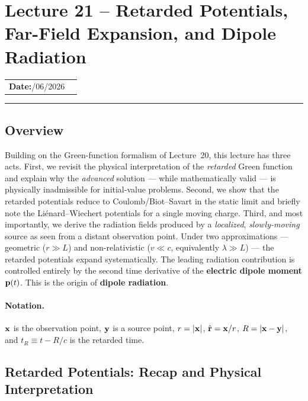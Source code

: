 \section{Lecture 21 -- Retarded Potentials, Far-Field Expansion, and Dipole Radiation}\label{sec:lec21}

\begin{center}
\begin{tabular}{ll}
  \textbf{Date:}\quad 16/06/2026 & \\
\end{tabular}
\end{center}
\hrule\vspace{1.5em}

\subsection*{Overview}

Building on the Green-function formalism of Lecture~20, this lecture has three acts.
First, we revisit the physical interpretation of the \emph{retarded} Green function and
explain why the \emph{advanced} solution --- while mathematically valid --- is physically
inadmissible for initial-value problems.
Second, we show that the retarded potentials reduce to Coulomb/Biot--Savart in the static
limit and briefly note the Liénard--Wiechert potentials for a single moving charge.
Third, and most importantly, we derive the radiation fields produced by a \emph{localized},
\emph{slowly-moving} source as seen from a distant observation point. Under two
approximations --- geometric ($r \gg L$) and non-relativistic ($v \ll c$, equivalently
$\lambda \gg L$) --- the retarded potentials expand systematically. The leading
radiation contribution is controlled entirely by the second time derivative of the
\textbf{electric dipole moment} $\mathbf{p}(t)$. This is the origin of \textbf{dipole
radiation}.

\paragraph{Notation.}
$\mathbf{x}$ is the observation point, $\mathbf{y}$ is a source point, $r=|\mathbf{x}|$,
$\hat{\mathbf{r}}=\mathbf{x}/r$, $R=|\mathbf{x}-\mathbf{y}|$, and $t_R \equiv t - R/c$ is the
retarded time.

\subsection{Retarded Potentials: Recap and Physical Interpretation}
\label{subsec:lec21-recap}

